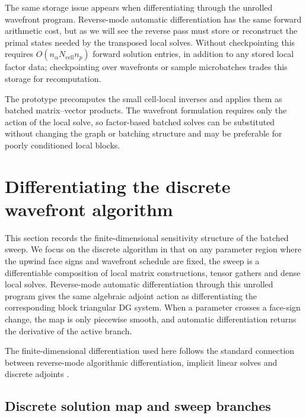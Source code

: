 \documentclass[final]{amsart}
\begin{document}
The same storage issue appears when differentiating through the
unrolled wavefront program.  Reverse-mode automatic differentiation
has the same forward arithmetic cost, but as we will see the reverse
pass must store or reconstruct the primal states needed by the
transposed local solves.  Without checkpointing this requires
$O(n_\alpha N_{\mathrm{cell}}n_p)$ forward solution entries, in
addition to any stored local factor data; checkpointing over
wavefronts or sample microbatches trades this storage for
recomputation.

\begin{remark}
The prototype precomputes the small cell-local inverses and applies
them as batched matrix--vector products. The wavefront formulation
requires only the action of the local solve, so factor-based batched
solves can be substituted without changing the graph or batching
structure and may be preferable for poorly conditioned local blocks.
\end{remark}

\section{Differentiating the discrete wavefront algorithm}
\label{sec:uq}

This section records the finite-dimensional sensitivity structure of
the batched sweep. We focus on the discrete algorithm in that on any
parameter region where the upwind face signs and wavefront schedule
are fixed, the sweep is a differentiable composition of local matrix
constructions, tensor gathers and dense local solves. Reverse-mode
automatic differentiation through this unrolled program gives the same
algebraic adjoint action as differentiating the corresponding block
triangular DG system. When a parameter crosses a face-sign change, the
map is only piecewise smooth, and automatic differentiation returns
the derivative of the active branch.

The finite-dimensional differentiation used here follows the standard
connection between reverse-mode algorithmic differentiation, implicit
linear solves and discrete adjoints \cite{BaydinEtAl2018ADSurvey,
  Giles2008MatrixDerivatives, FarrellEtAl2013DolfinAdjoint,
  BlondelEtAl2022ImplicitDiff}.

\subsection{Discrete solution map and sweep branches}
\end{document}
